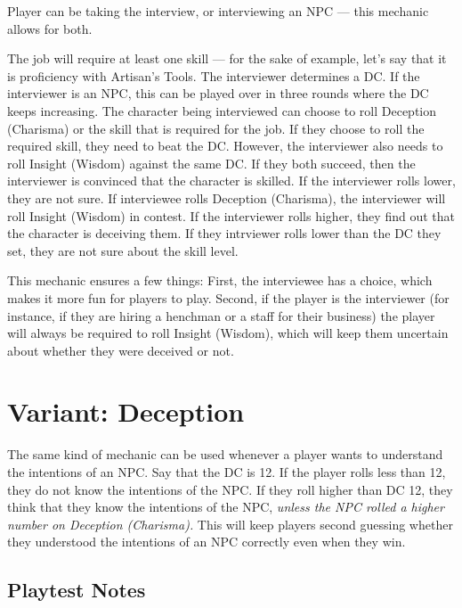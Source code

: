 \documentclass[twocolumn]{dndbook}
\begin{document}
Player can be taking the interview, or interviewing an NPC --- this mechanic allows for both.\par

The job will require at least one skill --- for the sake of example, let's say that it is proficiency with Artisan's Tools.
The interviewer determines a DC. If the interviewer is an NPC, this can be played over in three rounds where the DC keeps increasing.
The character being interviewed can choose to roll Deception (Charisma) or the skill that is required for the job.
If they choose to roll the required skill, they need to beat the DC. However, the interviewer also needs to roll Insight (Wisdom) against the same DC.
If they both succeed, then the interviewer is convinced that the character is skilled.
If the interviewer rolls lower, they are not sure.
If interviewee rolls Deception (Charisma), the interviewer will roll Insight (Wisdom) in contest.
If the interviewer rolls higher, they find out that the character is deceiving them.
If they intrviewer rolls lower than the DC they set, they are not sure about the skill level.\par

This mechanic ensures a few things: First, the interviewee has a choice, which makes it more fun for players to play.
Second, if the player is the interviewer (for instance, if they are hiring a henchman or a staff for their business)
the player will always be required to roll Insight (Wisdom), which will keep them uncertain about whether they were deceived or not.\par

\section{Variant: Deception}

The same kind of mechanic can be used whenever a player wants to understand the intentions of an NPC.
Say that the DC is 12. If the player rolls less than 12, they do not know the intentions of the NPC.
If they roll higher than DC 12, they think that they know the intentions of the NPC, \emph{unless the NPC rolled a higher number on Deception (Charisma).}
This will keep players second guessing whether they understood the intentions of an NPC correctly even when they win.\par

\subsection{Playtest Notes}
\end{document}
